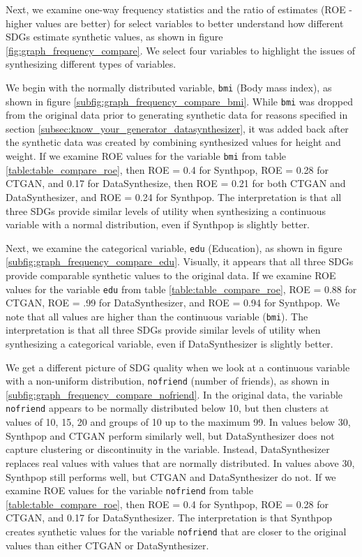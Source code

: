 \documentclass[runningheads]{llncs}
\begin{document}
Next, we examine one-way frequency statistics and the ratio of estimates (ROE -  higher values are better) for select variables to better understand how different SDGs estimate synthetic values, as shown in figure \ref{fig:graph_frequency_compare}.  We select four variables to highlight the issues of synthesizing different types of variables. 

We begin with  the normally distributed variable, \texttt{bmi} (Body mass index), as shown in figure \ref{subfig:graph_frequency_compare_bmi}.  While \texttt{bmi} was dropped from the original data prior to generating synthetic data for reasons specified in section \ref{subsec:know_your_generator_datasynthesizer}, it was added back after the synthetic data was created by combining synthesized values for height and weight.  If we examine ROE values for the variable  \texttt{bmi} from table \ref{table:table_compare_roe}, then ROE = 0.4 for Synthpop, ROE = 0.28 for CTGAN, and 0.17 for DataSynthesize, then ROE = 0.21 for both CTGAN and DataSynthesizer, and ROE = 0.24 for Synthpop.  The interpretation is that all three SDGs provide similar levels of utility when synthesizing a continuous variable with a normal distribution, even if Synthpop is slightly better.  

Next, we examine the categorical variable, \texttt{edu} (Education), as shown in figure \ref{subfig:graph_frequency_compare_edu}.  Visually, it appears that all three SDGs provide comparable synthetic values to the original data.  If we examine ROE values for the variable \texttt{edu} from table \ref{table:table_compare_roe}, ROE = 0.88 for CTGAN, ROE = .99 for DataSynthesizer, and ROE = 0.94 for Synthpop.  We note that all values are higher than the continuous variable (\texttt{bmi}).  The interpretation is that all three SDGs provide similar levels of utility when synthesizing a categorical variable, even if DataSynthesizer is slightly better.  

We get a different picture of SDG quality when we look at a continuous variable with a non-uniform distribution,  \texttt{nofriend} (number of friends), as shown in \ref{subfig:graph_frequency_compare_nofriend}.  In the original data, the variable \texttt{nofriend} appears to be normally distributed below 10, but then clusters at values of 10, 15, 20 and groups of 10 up to the maximum 99.  In values below 30, Synthpop and CTGAN perform similarly well, but DataSynthesizer does not capture clustering or discontinuity in the variable.  Instead, DataSynthesizer replaces real values with values that are normally distributed.  In values above 30, Synthpop still performs well, but CTGAN and DataSynthesizer do not.  If we examine ROE values for the variable  \texttt{nofriend} from table \ref{table:table_compare_roe}, then ROE = 0.4 for Synthpop, ROE = 0.28 for CTGAN, and 0.17 for DataSynthesizer.  The interpretation is that Synthpop creates synthetic values for the variable \texttt{nofriend} that are closer to the original values than either CTGAN or DataSynthesizer.
\end{document}
